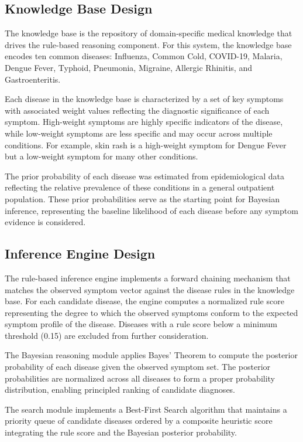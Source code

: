 \documentclass[12pt,a4paper]{article}
\begin{document}
\subsection{Knowledge Base Design}

The knowledge base is the repository of domain-specific medical knowledge that drives the rule-based reasoning component. For this system, the knowledge base encodes ten common diseases: Influenza, Common Cold, COVID-19, Malaria, Dengue Fever, Typhoid, Pneumonia, Migraine, Allergic Rhinitis, and Gastroenteritis.

Each disease in the knowledge base is characterized by a set of key symptoms with associated weight values reflecting the diagnostic significance of each symptom. High-weight symptoms are highly specific indicators of the disease, while low-weight symptoms are less specific and may occur across multiple conditions. For example, skin rash is a high-weight symptom for Dengue Fever but a low-weight symptom for many other conditions.

The prior probability of each disease was estimated from epidemiological data reflecting the relative prevalence of these conditions in a general outpatient population. These prior probabilities serve as the starting point for Bayesian inference, representing the baseline likelihood of each disease before any symptom evidence is considered.

\subsection{Inference Engine Design}

The rule-based inference engine implements a forward chaining mechanism that matches the observed symptom vector against the disease rules in the knowledge base. For each candidate disease, the engine computes a normalized rule score representing the degree to which the observed symptoms conform to the expected symptom profile of the disease. Diseases with a rule score below a minimum threshold (0.15) are excluded from further consideration.

The Bayesian reasoning module applies Bayes' Theorem to compute the posterior probability of each disease given the observed symptom set. The posterior probabilities are normalized across all diseases to form a proper probability distribution, enabling principled ranking of candidate diagnoses.

The search module implements a Best-First Search algorithm that maintains a priority queue of candidate diseases ordered by a composite heuristic score integrating the rule score and the Bayesian posterior probability.
\end{document}
